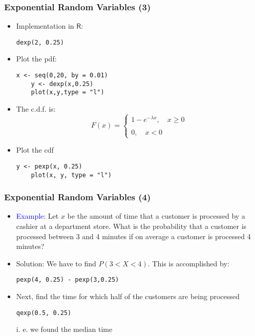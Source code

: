\documentclass[10pt]{beamer}
\theoremstyle{definition}
\begin{document}
\begin{frame}[fragile]
\frametitle{Exponential Random Variables (3)}
\begin{itemize}
	\item Implementation in $\mathsf{R}$:
	\begin{lstlisting}[style = rstyle, breaklines]
	dexp(2, 0.25) 
	\end{lstlisting}
	
	\item Plot the pdf:
	\begin{lstlisting}[style = rstyle, breaklines]
	x <- seq(0,20, by = 0.01)
	y <- dexp(x,0.25)
	plot(x,y,type = "l")
	\end{lstlisting}

	\item The c.d.f. is:
	\[
		F(x) = 
		\left\{
		\begin{array}{l}
			1 - e^{-\lambda x}, \quad x \geq 0\\
			\quad\\
			0, \quad x < 0
		\end{array}
		\right.
	\]
		
	\item Plot the cdf
	\begin{lstlisting}[style = rstyle, breaklines]
	y <- pexp(x, 0.25)
	plot(x, y, type = "l")
	\end{lstlisting}
\end{itemize}
\end{frame}

\begin{frame}[fragile]
\frametitle{Exponential Random Variables (4)}
\begin{itemize}
	\item \textcolor{blue}{Example:} Let $x$ be the amount of time that a customer is processed by a cashier at a department store. What is the probability that a customer is processed between 3 and 4 minutes if on average a customer is processed 4 minutes?
		
	\item Solution:	We have to find $P(3 < X < 4)$. This is accomplished by:
	\begin{lstlisting}[style = rstyle, breaklines]
	pexp(4, 0.25) - pexp(3,0.25)
	\end{lstlisting}

	\item Next, find the time for which half of the customers are being processed
	\begin{lstlisting}[style = rstyle, breaklines]
	qexp(0.5, 0.25)
	\end{lstlisting}
	i. e. we found the median time
\end{itemize}
\end{frame} 
\end{document}
